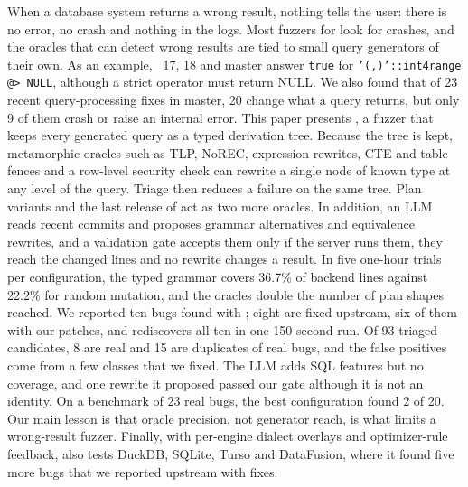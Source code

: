 When a database system returns a wrong result, nothing tells the user: there is
no error, no crash and nothing in the logs. Most fuzzers for \pg look for
crashes, and the oracles that can detect wrong results are tied to small query
generators of their own. As an example, \pg~17, 18 and master answer
\texttt{true} for \texttt{'(,)'::int4range @> NULL}, although a strict operator
must return NULL. We also found that of 23 recent query-processing fixes in \pg
master, 20 change what a query returns, but only 9 of them crash or raise an
internal error. This paper presents \tool, a fuzzer that keeps every generated
query as a typed derivation tree. Because the tree is kept, metamorphic oracles
such as TLP, NoREC, expression rewrites, CTE and table fences and a row-level
security check can rewrite a single node of known type at any level of the
query. Triage then reduces a failure on the same tree. Plan variants and the last release
of \pg act as two more oracles. In addition, an LLM reads recent commits and
proposes grammar alternatives and equivalence rewrites, and a validation gate
accepts them only if the server runs them, they reach the changed lines and no
rewrite changes a result. In five one-hour trials per configuration, the typed
grammar covers 36.7\% of backend lines against 22.2\% for random mutation, and
the oracles double the number of plan shapes reached. We reported ten bugs found
with \tool; eight are fixed upstream, six of them with our patches, and \tool
rediscovers all ten in one 150-second run. Of 93 triaged candidates, 8 are real
and 15 are duplicates of real bugs, and the false positives come from a few
classes that we fixed. The LLM adds SQL features but no coverage, and one
rewrite it proposed passed our gate although it is not an identity. On a
benchmark of 23 real bugs, the best configuration found 2 of 20. Our main lesson
is that oracle precision, not generator reach, is what limits a wrong-result
fuzzer. Finally, with per-engine dialect overlays and optimizer-rule feedback,
\tool also tests DuckDB, SQLite, Turso and DataFusion, where it found five more
bugs that we reported upstream with fixes.
